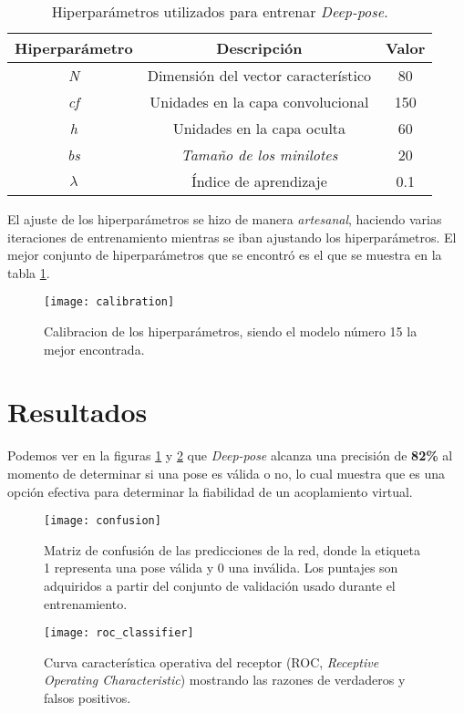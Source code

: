 \begin{table}[H]
\begin{center}
\begin{tabular}{|c|c|c|}
\hline
Hiperparámetro & Descripción                         & Valor \\ \hline
\textit{N}     & Dimensión del vector característico & 80    \\
\textit{cf}    & Unidades en la capa convolucional   & 150   \\
\textit{h}     & Unidades en la capa oculta          & 60    \\
\textit{bs}    & \textit{Tamaño de los minilotes}    & 20    \\
$\lambda$         & Índice de aprendizaje               & 0.1   \\ \hline
\end{tabular}
\caption{Hiperparámetros utilizados para entrenar \textit{Deep-pose}.}
\label{tab:hyp}
\end{center}
\end{table}

El ajuste de los hiperparámetros se hizo de manera \textit{artesanal},
haciendo varias iteraciones de entrenamiento mientras se iban ajustando
los hiperparámetros. El mejor conjunto de hiperparámetros que se encontró
es el que se muestra en la tabla \ref{tab:hyp}.

\begin{figure}[H]
  \texttt{[image: calibration]} \centering \caption{Calibracion
  de los hiperparámetros, siendo el modelo número 15 la mejor
  encontrada.}
\end{figure}

\section{Resultados}
Podemos ver en la figuras \ref{fig:confusion} y \ref{fig:roc}
que \textit{Deep-pose} alcanza una precisión de \textbf{82\%} al
momento de determinar si una pose es válida o no, lo cual muestra que
es una opción efectiva para determinar la fiabilidad de un
acoplamiento virtual.

\begin{figure}[h]
  \texttt{[image: confusion]} \centering
  \caption{Matriz de confusión de las predicciones de la red,
  donde la etiqueta 1 representa una pose válida y 0 una inválida.
  Los puntajes son adquiridos a partir del conjunto de validación
  usado durante el entrenamiento.}
  \label{fig:confusion}
\end{figure}

\begin{figure}[h]
  \texttt{[image: roc\_classifier]} \centering
  \caption{Curva característica operativa del receptor (ROC,
  \textit{Receptive Operating Characteristic}) mostrando
  las razones de verdaderos y falsos positivos.}
  \label{fig:roc}
\end{figure}
